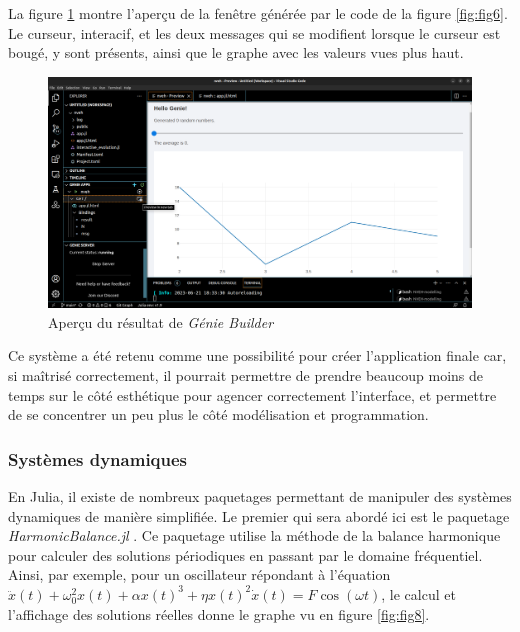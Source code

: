 \documentclass[a4paper, french, 12pt, titlepage]{article}
\begin{document}
La figure \ref{fig:fig7} montre l'aperçu de la fenêtre générée par le code de la figure \ref{fig:fig6}.
Le curseur, interacif, et les deux messages qui se modifient lorsque le curseur est bougé, y sont présents, ainsi que le graphe avec les valeurs vues plus haut. 

\begin{figure}[H]
  \includegraphics[width=\linewidth]{geniebuilder_result.png}
  \caption{Aperçu du résultat de \emph{Génie Builder}}
  \label{fig:fig7}
\end{figure}

Ce système a été retenu comme une possibilité pour créer l'application finale car, si maîtrisé correctement, il pourrait permettre de prendre beaucoup moins de temps sur le côté esthétique pour agencer correctement l'interface, et permettre de se concentrer un peu plus le côté modélisation et programmation.  

\subsubsection{Systèmes dynamiques}

En Julia, il existe de nombreux paquetages permettant de manipuler des systèmes dynamiques de manière simplifiée.
Le premier qui sera abordé ici est le paquetage \emph{HarmonicBalance.jl} \cite{kovsata2022harmonicbalance}.
Ce paquetage utilise la méthode de la balance harmonique pour calculer des solutions périodiques en passant par le domaine fréquentiel.
Ainsi, par exemple, pour un oscillateur répondant à l'équation $\ddot x(t) + \omega_0^2 x(t) + \alpha x(t)^3 + \eta x(t)^2 \dot x (t) = F \cos(\omega t)$, le calcul et l'affichage des solutions réelles donne le graphe vu en figure \ref{fig:fig8}.\\
\end{document}
